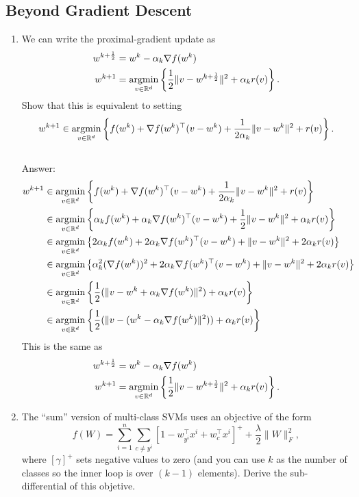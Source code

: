 \documentclass{article}
\def\blu#1{{\color{blu}#1}}
\def\gre#1{{\color{gre}#1}}
\def\norm#1{\|#1\|}
\def\R{\mathbb{R}}
\newcommand{\argmin}[1]{\mathop{\hbox{argmin}}_{#1}}
\def\half{\frac 1 2}
\def\enum#1{\begin{enumerate}#1\end{enumerate}}
\begin{document}
\subsection{Beyond Gradient Descent}


\enum{
\item We can write the proximal-gradient update as
\begin{align*}
w^{k+\half} & = w^k - \alpha_k \nabla f(w^k)\\
w^{k+1} &= \argmin{v\in\R^d}\left\{\frac{1}{2}\norm{v -w^{k+\half}}^2 + \alpha_kr(v)\right\}.
\end{align*}
\blu{Show that this is equivalent to setting
\[
w^{k+1} \in \argmin{v\in\R^d} \left\{ f(w^k) + \nabla f(w^k)^\top (v-w^k) + \frac{1}{2\alpha_k}\norm{v-w^k}^2  +r(v)\right\}.
\]
}
\gre{
\\Answer: 
\begin{align*}
w^{k+1}& \in \argmin{v\in\R^d} \left\{ f(w^k) + \nabla f(w^k)^\top (v-w^k) + \frac{1}{2\alpha_k}\norm{v-w^k}^2  +r(v)\right\}\\
&\in\argmin{v\in\R^d} \left\{ \alpha_k f(w^k) + \alpha_k\nabla f(w^k)^\top (v-w^k) + \frac{1}{2}\norm{v-w^k}^2  +\alpha_k r(v)\right\}\\
&\in\argmin{v\in\R^d} \left\{ 2\alpha_k f(w^k) + 2\alpha_k\nabla f(w^k)^\top (v-w^k) + \norm{v-w^k}^2  +2\alpha_k r(v)\right\}\\
&\in\argmin{v\in\R^d} \left\{ \alpha_k^2 (\nabla f(w^k))^2 + 2\alpha_k\nabla f(w^k)^\top (v-w^k) + \norm{v-w^k}^2  +2\alpha_k r(v)\right\}\\
&\in\argmin{v\in\R^d} \left\{\frac{1}{2}(\norm{v-w^k + \alpha_k\nabla f(w^k)}^2) +\alpha_k r(v)\right\}\\
&\in\argmin{v\in\R^d} \left\{\frac{1}{2}(\norm{v-(w^k - \alpha_k\nabla f(w^k)}^2)) +\alpha_k r(v)\right\}\\
\end{align*}
This is the same as
\begin{align*}
w^{k+\half} & = w^k - \alpha_k \nabla f(w^k)\\
w^{k+1} &= \argmin{v\in\R^d}\left\{\frac{1}{2}\norm{v -w^{k+\half}}^2 + \alpha_kr(v)\right\}.
\end{align*}
}
\item The ``sum'' version of multi-class SVMs uses an objective of the form
\[
f(W) = \sum_{i=1}^n \sum_{c \neq y^i}[1 - w_{y^i}^\top x^i + w_c^\top x^i]^+ + \frac \lambda 2 \norm{W}_F^2,
\]
where $[\gamma]^+$ sets negative values to zero (and you can use $k$ as the number of classes so the inner loop is over $(k-1)$ elements). \blu{Derive the sub-differential of this objetive}.
}
\end{document}
